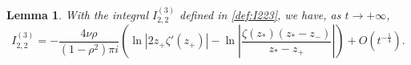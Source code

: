\documentclass[11pt,a4paper]{article}
\newtheorem{lemma}[thm]{Lemma}
\numberwithin{equation}{section}
\begin{document}


\begin{lemma}\label{I-22-3}
With the integral $I^{(3)}_{2,2}$ defined in \eqref{def:I223}, we have, as $t\to+\infty$,
\begin{equation}\label{eq:estI223}
I^{(3)}_{2,2}=-\frac{4\nu\rho}{(1-\rho^2)\pi i}\left(\ln\left|2z_+\zeta'(z_+)\right|
-\ln\left|\frac{\zeta(z_*)(z_*-z_-)}{z_*-z_+}\right|\right)+O\left(t^{-\frac{1}{4}}\right).
\end{equation}
\end{lemma}
\end{document}

